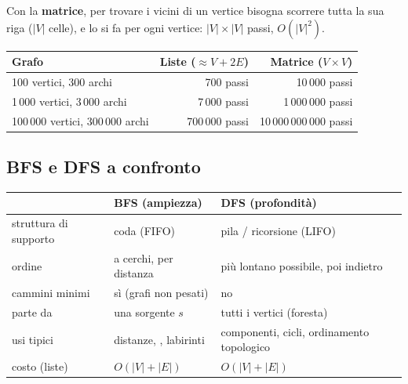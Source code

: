 Con la \textbf{matrice}, per trovare i vicini di un vertice bisogna scorrere tutta la sua
riga ($|V|$ celle), e lo si fa per ogni vertice: $|V| \times |V|$ passi, $O(|V|^2)$.
\begin{center}
\begin{tabular}{lrr}
\toprule
\textbf{Grafo} & \textbf{Liste} ($\approx V + 2E$) & \textbf{Matrice} ($V \times V$) \\
\midrule
100 vertici, 300 archi           & 700 passi       & 10\,000 passi \\
1\,000 vertici, 3\,000 archi     & 7\,000 passi    & 1\,000\,000 passi \\
100\,000 vertici, 300\,000 archi & 700\,000 passi  & 10\,000\,000\,000 passi \\
\bottomrule
\end{tabular}
\end{center}

\subsection*{BFS e DFS a confronto}
\begin{center}
\begin{tabular}{p{3.2cm}p{4.6cm}p{4.6cm}}
\toprule
 & \textbf{BFS (ampiezza)} & \textbf{DFS (profondità)} \\
\midrule
struttura di supporto & coda (FIFO)                     & pila / ricorsione (LIFO) \\
ordine                & a cerchi, per distanza          & più lontano possibile, poi indietro \\
cammini minimi        & sì (grafi non pesati)           & no \\
parte da              & una sorgente $s$                & tutti i vertici (foresta) \\
usi tipici            & distanze, \q{amici di amici}, labirinti & componenti, cicli, ordinamento topologico \\
costo (liste)         & $O(|V| + |E|)$                  & $O(|V| + |E|)$ \\
\bottomrule
\end{tabular}
\end{center}

